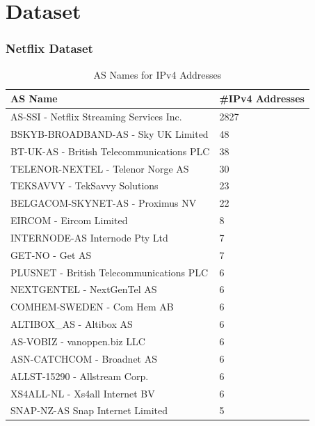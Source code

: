 \chapter{Dataset}
\subsection*{Netflix Dataset}

\begin{table}[!h]
	\centering
	\caption{AS Names for IPv4 Addresses}
	\label{table:asnipv4}
	\begin{tabular}{lp{3cm}}
  		\toprule
  		\textbf{AS Name} & \textbf{\#IPv4 Addresses} \\ 
  		\midrule
		AS-SSI - Netflix Streaming Services Inc.          &                              2827  \\
		BSKYB-BROADBAND-AS - Sky UK Limited               &                                48  \\
		BT-UK-AS - British Telecommunications PLC           &                              38  \\
		TELENOR-NEXTEL - Telenor Norge AS                    &                             30  \\
		TEKSAVVY - TekSavvy Solutions                        &                             23  \\
		BELGACOM-SKYNET-AS - Proximus NV                    &                              22  \\
		EIRCOM - Eircom Limited                              &                              8  \\
		INTERNODE-AS Internode Pty Ltd                      &                               7  \\
		GET-NO - Get AS                                    &                                7  \\
		PLUSNET - British Telecommunications PLC             &                              6  \\
		NEXTGENTEL - NextGenTel AS                         &                                6  \\
		COMHEM-SWEDEN - Com Hem AB                         &                                6  \\
		ALTIBOX\_AS - Altibox AS                           &                                 6 \\
		AS-VOBIZ - vanoppen.biz LLC                       &                                 6  \\
		ASN-CATCHCOM - Broadnet AS                         &                                6  \\
		  		ALLST-15290 - Allstream Corp.                      &                                6  \\
		XS4ALL-NL - Xs4all Internet BV                     &                                6  \\
		SNAP-NZ-AS Snap Internet Limited                    &                               5  \\
		\bottomrule
\end{tabular}
\end{table}

